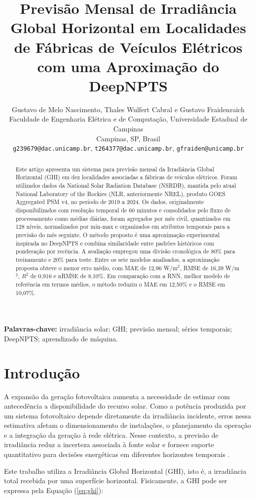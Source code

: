 \documentclass[11pt,a4paper]{article}
\title{Previsão Mensal de Irradiância Global Horizontal em Localidades de Fábricas de Veículos Elétricos com uma Aproximação do DeepNPTS}
\author{Gustavo de Melo Nascimento, Thales Wulfert Cabral e Gustavo Fraidenraich\\[0.4em]
\small Faculdade de Engenharia Elétrica e de Computação, Universidade Estadual de Campinas\\
\small Campinas, SP, Brasil\\
\small \texttt{g239679@dac.unicamp.br}, \texttt{t264377@dac.unicamp.br}, \texttt{gfraiden@unicamp.br}}
\date{}
\begin{document}
\maketitle

\begin{abstract}
Este artigo apresenta um sistema para previsão mensal da Irradiância Global Horizontal (GHI) em dez localidades associadas a fábricas de veículos elétricos. Foram utilizados dados da National Solar Radiation Database (NSRDB), mantida pelo atual National Laboratory of the Rockies (NLR, anteriormente NREL), produto GOES Aggregated PSM v4, no período de 2019 a 2024. Os dados, originalmente disponibilizados com resolução temporal de 60 minutos e consolidados pelo fluxo de processamento como médias diárias, foram agregados por mês civil, quantizados em 128 níveis, normalizados por min-max e organizados em atributos temporais para a previsão do mês seguinte. O método proposto é uma aproximação experimental inspirada no DeepNPTS e combina similaridade entre padrões históricos com ponderação por recência. A avaliação empregou uma divisão cronológica de 80\% para treinamento e 20\% para teste. Entre os sete modelos analisados, a aproximação proposta obteve o menor erro médio, com MAE de 12,96 W/m$^2$, RMSE de 16,39 W/m$^2$, $R^2$ de 0,916 e nRMSE de 8,10\%. Em comparação com a RNN, melhor modelo de referência em termos médios, o método reduziu o MAE em 12,50\% e o RMSE em 10,07\%.
\end{abstract}

\noindent\textbf{Palavras-chave:} irradiância solar; GHI; previsão mensal; séries temporais; DeepNPTS; aprendizado de máquina.

\section{Introdução}

A expansão da geração fotovoltaica aumenta a necessidade de estimar com antecedência a disponibilidade do recurso solar. Como a potência produzida por um sistema fotovoltaico depende diretamente da irradiância incidente, erros nessa estimativa afetam o dimensionamento de instalações, o planejamento da operação e a integração da geração à rede elétrica. Nesse contexto, a previsão de irradiância reduz a incerteza associada à fonte solar e fornece suporte quantitativo para decisões energéticas em diferentes horizontes temporais \cite{antonanzas2016,voyant2017,yang2018}.

Este trabalho utiliza a Irradiância Global Horizontal (GHI), isto é, a irradiância total recebida por uma superfície horizontal. Fisicamente, a GHI pode ser expressa pela Equação (\ref{eq:ghi}):
\end{document}

